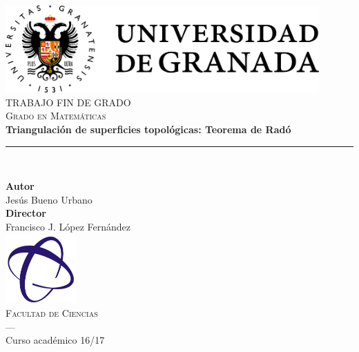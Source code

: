 \begin{titlepage}
 
 
\newlength{\centeroffset}
\setlength{\centeroffset}{-0.5\oddsidemargin}
\addtolength{\centeroffset}{0.5\evensidemargin}
\thispagestyle{empty}

\noindent\hspace*{\centeroffset}\begin{minipage}{\textwidth}

\centering
\includegraphics[width=0.9\textwidth]{images/logo_ugr.png}\\[1.4cm]

\textsc{ \Large TRABAJO FIN DE GRADO\\[0.2cm]}
\textsc{Grado en Matemáticas}\\[1cm]
% 
{\Huge\bfseries Triangulación de superficies topológicas: Teorema de Radó
}
\noindent\rule[-1ex]{\textwidth}{3pt}\\[3.5ex]
\end{minipage}

\vspace{2.5cm}
\noindent\hspace*{\centeroffset}\begin{minipage}{\textwidth}
\centering

\textbf{Autor}\\ {Jesús Bueno Urbano}\\[2.5ex]
\textbf{Director}\\
{Francisco J. López Fernández}\\[2cm]
\includegraphics[width=0.2\textwidth]{images/fciencias.png}\\[0.1cm]
\textsc{Facultad de Ciencias}\\
\textsc{---}\\
Curso académico 16/17
\end{minipage}
\end{titlepage}


